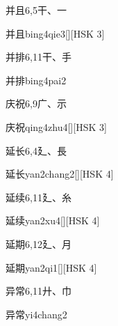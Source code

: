 \begin{entry}{并且}{6,5}{⼲、⼀}
  \begin{phonetics}{并且}{bing4qie3}[][HSK 3]
  \end{phonetics}
\end{entry}

\begin{entry}{并排}{6,11}{⼲、⼿}
  \begin{phonetics}{并排}{bing4pai2}
  \end{phonetics}
\end{entry}

\begin{entry}{庆祝}{6,9}{⼴、⽰}
  \begin{phonetics}{庆祝}{qing4zhu4}[][HSK 3]
  \end{phonetics}
\end{entry}

\begin{entry}{延长}{6,4}{⼵、⾧}
  \begin{phonetics}{延长}{yan2chang2}[][HSK 4]
  \end{phonetics}
\end{entry}

\begin{entry}{延续}{6,11}{⼵、⽷}
  \begin{phonetics}{延续}{yan2xu4}[][HSK 4]
  \end{phonetics}
\end{entry}

\begin{entry}{延期}{6,12}{⼵、⽉}
  \begin{phonetics}{延期}{yan2qi1}[][HSK 4]
  \end{phonetics}
\end{entry}

\begin{entry}{异常}{6,11}{⼶、⼱}
  \begin{phonetics}{异常}{yi4chang2}
  \end{phonetics}
\end{entry}

